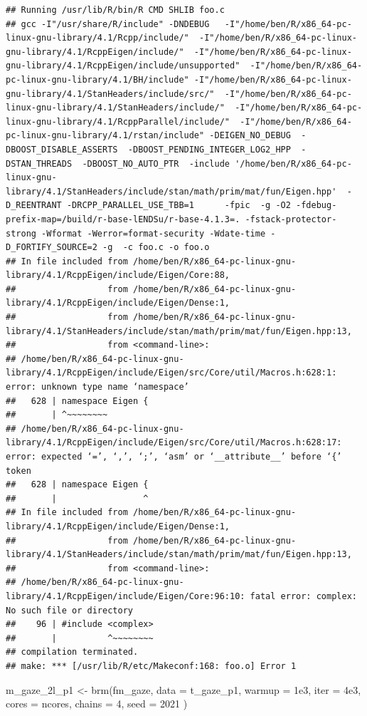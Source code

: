 \documentclass[
]{article}
\newenvironment{Shaded}{\begin{snugshade}}{\end{snugshade}}
\newcommand{\AttributeTok}[1]{\textcolor[rgb]{0.77,0.63,0.00}{#1}}
\newcommand{\DecValTok}[1]{\textcolor[rgb]{0.00,0.00,0.81}{#1}}
\newcommand{\FloatTok}[1]{\textcolor[rgb]{0.00,0.00,0.81}{#1}}
\newcommand{\FunctionTok}[1]{\textcolor[rgb]{0.00,0.00,0.00}{#1}}
\newcommand{\NormalTok}[1]{#1}
\newcommand{\OtherTok}[1]{\textcolor[rgb]{0.56,0.35,0.01}{#1}}
\begin{document}
\begin{verbatim}
## Running /usr/lib/R/bin/R CMD SHLIB foo.c
## gcc -I"/usr/share/R/include" -DNDEBUG   -I"/home/ben/R/x86_64-pc-linux-gnu-library/4.1/Rcpp/include/"  -I"/home/ben/R/x86_64-pc-linux-gnu-library/4.1/RcppEigen/include/"  -I"/home/ben/R/x86_64-pc-linux-gnu-library/4.1/RcppEigen/include/unsupported"  -I"/home/ben/R/x86_64-pc-linux-gnu-library/4.1/BH/include" -I"/home/ben/R/x86_64-pc-linux-gnu-library/4.1/StanHeaders/include/src/"  -I"/home/ben/R/x86_64-pc-linux-gnu-library/4.1/StanHeaders/include/"  -I"/home/ben/R/x86_64-pc-linux-gnu-library/4.1/RcppParallel/include/"  -I"/home/ben/R/x86_64-pc-linux-gnu-library/4.1/rstan/include" -DEIGEN_NO_DEBUG  -DBOOST_DISABLE_ASSERTS  -DBOOST_PENDING_INTEGER_LOG2_HPP  -DSTAN_THREADS  -DBOOST_NO_AUTO_PTR  -include '/home/ben/R/x86_64-pc-linux-gnu-library/4.1/StanHeaders/include/stan/math/prim/mat/fun/Eigen.hpp'  -D_REENTRANT -DRCPP_PARALLEL_USE_TBB=1      -fpic  -g -O2 -fdebug-prefix-map=/build/r-base-lENDSu/r-base-4.1.3=. -fstack-protector-strong -Wformat -Werror=format-security -Wdate-time -D_FORTIFY_SOURCE=2 -g  -c foo.c -o foo.o
## In file included from /home/ben/R/x86_64-pc-linux-gnu-library/4.1/RcppEigen/include/Eigen/Core:88,
##                  from /home/ben/R/x86_64-pc-linux-gnu-library/4.1/RcppEigen/include/Eigen/Dense:1,
##                  from /home/ben/R/x86_64-pc-linux-gnu-library/4.1/StanHeaders/include/stan/math/prim/mat/fun/Eigen.hpp:13,
##                  from <command-line>:
## /home/ben/R/x86_64-pc-linux-gnu-library/4.1/RcppEigen/include/Eigen/src/Core/util/Macros.h:628:1: error: unknown type name ‘namespace’
##   628 | namespace Eigen {
##       | ^~~~~~~~~
## /home/ben/R/x86_64-pc-linux-gnu-library/4.1/RcppEigen/include/Eigen/src/Core/util/Macros.h:628:17: error: expected ‘=’, ‘,’, ‘;’, ‘asm’ or ‘__attribute__’ before ‘{’ token
##   628 | namespace Eigen {
##       |                 ^
## In file included from /home/ben/R/x86_64-pc-linux-gnu-library/4.1/RcppEigen/include/Eigen/Dense:1,
##                  from /home/ben/R/x86_64-pc-linux-gnu-library/4.1/StanHeaders/include/stan/math/prim/mat/fun/Eigen.hpp:13,
##                  from <command-line>:
## /home/ben/R/x86_64-pc-linux-gnu-library/4.1/RcppEigen/include/Eigen/Core:96:10: fatal error: complex: No such file or directory
##    96 | #include <complex>
##       |          ^~~~~~~~~
## compilation terminated.
## make: *** [/usr/lib/R/etc/Makeconf:168: foo.o] Error 1
\end{verbatim}

\begin{Shaded}
\begin{Highlighting}[]
\NormalTok{m\_gaze\_2l\_p1 }\OtherTok{\textless{}{-}} \FunctionTok{brm}\NormalTok{(fm\_gaze, }\AttributeTok{data =}\NormalTok{ t\_gaze\_p1, }
                    \AttributeTok{warmup =} \FloatTok{1e3}\NormalTok{, }\AttributeTok{iter =} \FloatTok{4e3}\NormalTok{, }\AttributeTok{cores =}\NormalTok{ ncores, }\AttributeTok{chains =} \DecValTok{4}\NormalTok{, }
                    \AttributeTok{seed =} \DecValTok{2021}
\NormalTok{                    )}
\end{Highlighting}
\end{Shaded}
\end{document}
